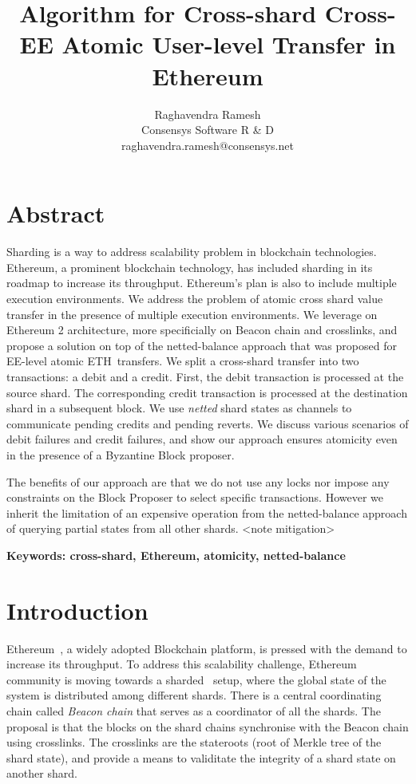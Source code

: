 \documentclass{IEEEtran}
\title{Algorithm for Cross-shard Cross-EE Atomic User-level \eth Transfer in Ethereum}
\author{Raghavendra Ramesh\\Consensys Software R \& D\\raghavendra.ramesh@consensys.net}
\date{}
\newcommand{\eth}[0]{ETH~}
\begin{document}
\maketitle

\section*{Abstract}
Sharding is a way to address scalability problem in blockchain technologies. Ethereum, a prominent blockchain technology, has included sharding in its roadmap to increase its throughput. Ethereum's plan is also to include multiple execution environments. We address the problem of atomic cross shard value transfer in the presence of multiple execution environments. We leverage on Ethereum 2 architecture, more specificially on Beacon chain and crosslinks, and propose a solution on top of the netted-balance approach that was proposed for EE-level atomic \eth transfers. We split a cross-shard transfer into two transactions: a debit and a credit. First, the debit transaction is processed at the source shard. The corresponding credit transaction is processed at the destination shard in a subsequent block. We use {\em netted} shard states as channels to communicate pending credits and pending reverts. We discuss various scenarios of debit failures and credit failures, and show our approach ensures atomicity even in the presence of a Byzantine Block proposer. 

The benefits of our approach are that we do not use any locks nor impose any constraints on the Block Proposer to select specific transactions. However we inherit the limitation of an expensive operation from the netted-balance approach of querying partial states from all other shards. <note mitigation>

\bigskip

{\bf Keywords: cross-shard, Ethereum, atomicity, netted-balance}

\section{Introduction}

Ethereum~\cite{eth}, a widely adopted Blockchain platform, is pressed with the demand to increase its throughput. To address this scalability challenge, Ethereum community is moving towards a sharded~\cite{sharding} setup, where the global state of the system is distributed among different shards. There is a central coordinating chain called {\em Beacon chain} that serves as a coordinator of all the shards. The proposal is that the blocks on the shard chains synchronise with the Beacon chain using crosslinks. The crosslinks are the stateroots (root of Merkle tree of the shard state), and provide a means to validitate the integrity of a shard state on another shard. 
\end{document}
